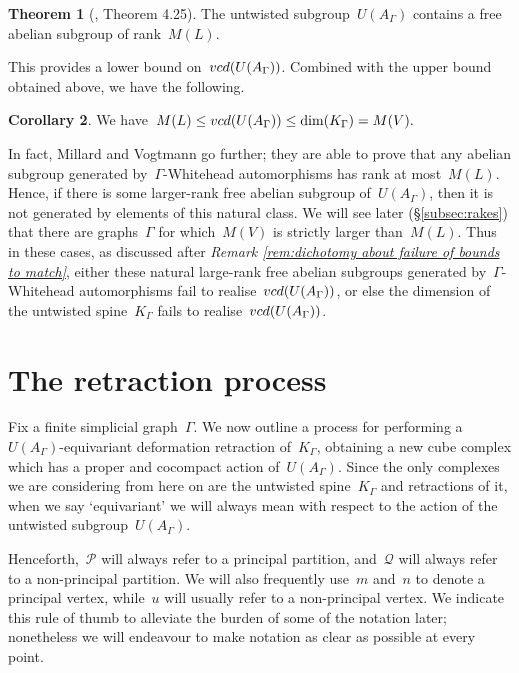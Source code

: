 \documentclass[11pt]{amsart}
\theoremstyle{definition}
\theoremstyle{definition}
\theoremstyle{definition}
\theoremstyle{definition}
\newtheorem{theorem}{Theorem}[section]
\newtheorem{corollary}[theorem]{Corollary}
\newcommand{\calQ}{\mathcal{Q}}
\newcommand{\calP}{\mathcal{P}} %
\newcommand{\uag}{U(A_{\Gamma})} %
\newcommand{\vcduag}{\textsc{vcd}(U(A_{\Gamma}))} %
\newcommand{\spine}{K_{\Gamma}} %
\begin{document}
\begin{theorem}[\cite{MillardVogtmannCubeComplexes21}, Theorem 4.25]\label{thm:Millard-Vogtmann M(L) lower bound}
    The untwisted subgroup~$\uag$ contains a free abelian subgroup of rank~$M(L)$.
\end{theorem}

This provides a lower bound on~$\vcduag$. Combined with the upper bound obtained above, we have the following.

\begin{corollary}\label{corollary a priori bounds on vcd}
    We have~$M(L) \leq \vcduag \leq \dim(\spine) = M(V).$
\end{corollary}

In fact, Millard and Vogtmann go further; they are able to prove that any abelian subgroup generated by~$\Gamma$-Whitehead automorphisms has rank at most~$M(L)$. Hence, if there is some larger-rank free abelian subgroup of~$\uag$, then it is not generated by elements of this natural class. We will see later (\S\ref{subsec:rakes}) that there are graphs~$\Gamma$ for which~$M(V)$ is strictly larger than~$M(L)$. Thus in these cases, as discussed after \emph{Remark \ref{rem:dichotomy about failure of bounds to match}}, either these natural large-rank free abelian subgroups generated by~$\Gamma$-Whitehead automorphisms fail to realise~$\vcduag$, or else the dimension of the untwisted spine~$\spine$ fails to realise~$\vcduag$. 

\section{The retraction process}\label{sec:retraction process}

Fix a finite simplicial graph~$\Gamma$. We now outline a process for performing a~$\uag$-equivariant deformation retraction of~$\spine$, obtaining a new cube complex which has a proper and cocompact action of~$\uag$. Since the only complexes we are considering from here on are the untwisted spine~$\spine$ and retractions of it, when we say `equivariant' we will always mean with respect to the action of the untwisted subgroup~$\uag$.

Henceforth,~$\calP$ will always refer to a principal partition, and~$\calQ$ will always refer to a non-principal partition. We will also frequently use~$m$ and~$n$ to denote a principal vertex, while~$u$ will usually refer to a non-principal vertex. We indicate this rule of thumb to alleviate the burden of some of the notation later; nonetheless we will endeavour to make notation as clear as possible at every point.
\end{document}
